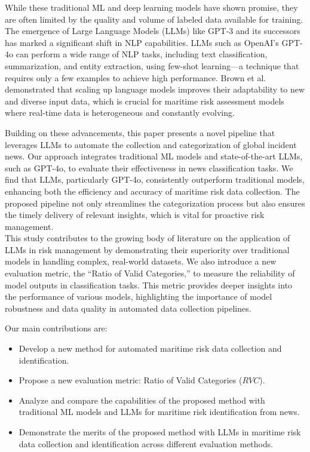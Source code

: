 While these traditional ML and deep learning models have shown promise, they are often limited by the quality and volume of labeled data available for training. The emergence of Large Language Models (LLMs) like GPT-3 and its successors has marked a significant shift in NLP capabilities. LLMs such as OpenAI's GPT-4o can perform a wide range of NLP tasks, including text classification, summarization, and entity extraction, using few-shot learning---a technique that requires only a few examples to achieve high performance. Brown et al. demonstrated that scaling up language models improves their adaptability to new and diverse input data, which is crucial for maritime risk assessment models where real-time data is heterogeneous and constantly evolving\cite{brown2020language}.

Building on these advancements, this paper presents a novel pipeline that leverages LLMs to automate the collection and categorization of global incident news. Our approach integrates traditional ML models and state-of-the-art LLMs, such as GPT-4o, to evaluate their effectiveness in news classification tasks. We find that LLMs, particularly GPT-4o, consistently outperform traditional models, enhancing both the efficiency and accuracy of maritime risk data collection. The proposed pipeline not only streamlines the categorization process but also ensures the timely delivery of relevant insights, which is vital for proactive risk management.\\

This study contributes to the growing body of literature on the application of LLMs in risk management by demonstrating their superiority over traditional models in handling complex, real-world datasets. We also introduce a new evaluation metric, the ``Ratio of Valid Categories,'' to measure the reliability of model outputs in classification tasks. This metric provides deeper insights into the performance of various models, highlighting the importance of model robustness and data quality in automated data collection pipelines.

Our main contributions are:
\begin{itemize}
    \item Develop a new method for automated maritime risk data collection and identification.
    \item Propose a new evaluation metric: Ratio of Valid Categories ($RVC$).
    \item Analyze and compare the capabilities of the proposed method with traditional ML models and LLMs for maritime risk identification from news.
    \item Demonstrate the merits of the proposed method with LLMs in maritime risk data collection and identification across different evaluation methods.
\end{itemize}

